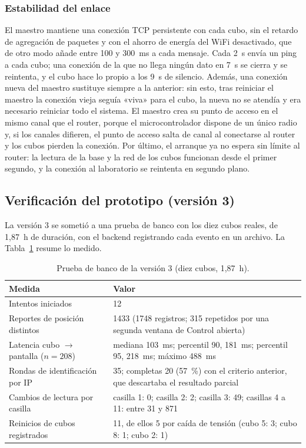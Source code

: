 \documentclass{book}
\begin{document}
\subsubsection{Estabilidad del enlace}

El maestro mantiene una conexión TCP persistente con cada cubo, sin el retardo de agregación de paquetes y con el ahorro de energía del WiFi desactivado, que de otro modo añade entre 100 y 300~ms a cada mensaje. Cada 2~s envía un ping a cada cubo; una conexión de la que no llega ningún dato en 7~s se cierra y se reintenta, y el cubo hace lo propio a los 9~s de silencio. Además, una conexión nueva del maestro sustituye siempre a la anterior: sin esto, tras reiniciar el maestro la conexión vieja seguía «viva» para el cubo, la nueva no se atendía y era necesario reiniciar todo el sistema. El maestro crea su punto de acceso en el mismo canal que el router, porque el microcontrolador dispone de un único radio y, si los canales difieren, el punto de acceso salta de canal al conectarse al router y los cubos pierden la conexión. Por último, el arranque ya no espera sin límite al router: la lectura de la base y la red de los cubos funcionan desde el primer segundo, y la conexión al laboratorio se reintenta en segundo plano.

\subsection{Verificación del prototipo (versión 3)}
\label{sec:verificacion-prototipo}

La versión 3 se sometió a una prueba de banco con los diez cubos reales, de 1,87~h de duración, con el backend registrando cada evento en un archivo. La Tabla~\ref{tab:prueba-banco} resume lo medido.

\begin{table}[H]
\centering
\caption{Prueba de banco de la versión 3 (diez cubos, 1,87~h).}
\label{tab:prueba-banco}
\renewcommand{\arraystretch}{1.3}
\begin{tabular}{|p{4.8cm}|p{6.0cm}|}
\hline
\textbf{Medida} & \textbf{Valor} \\
\hline
Intentos iniciados & 12 \\
\hline
Reportes de posición distintos & 1433 (1748 registros; 315 repetidos por una segunda ventana de Control abierta) \\
\hline
Latencia cubo $\rightarrow$ pantalla ($n=208$) & mediana 103~ms; percentil 90, 181~ms; percentil 95, 218~ms; máximo 488~ms \\
\hline
Rondas de identificación por IP & 35; completas 20 (57~\%) con el criterio anterior, que descartaba el resultado parcial \\
\hline
Cambios de lectura por casilla & casilla 1: 0; casilla 2: 2; casilla 3: 49; casillas 4 a 11: entre 31 y 871 \\
\hline
Reinicios de cubos registrados & 11, de ellos 5 por caída de tensión (cubo 5: 3; cubo 8: 1; cubo 2: 1) \\
\hline
\end{tabular}
\end{table}
\end{document}
